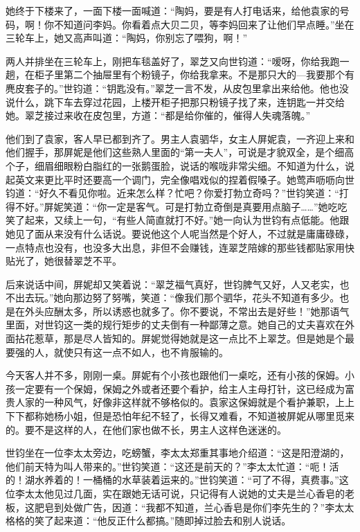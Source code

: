 \par 她终于下楼来了，一面下楼一面喊道：“陶妈，要是有人打电话来，给他袁家的号码，啊！你不知道问李妈。你看着点大贝二贝，等李妈回来了让他们早点睡。”坐在三轮车上，她又高声叫道：“陶妈，你别忘了喂狗，啊！”
\par 两人并排坐在三轮车上，刚把车毯盖好了，翠芝又向世钧道：“嗳呀，你给我跑一趟，在柜子里第二个抽屉里有个粉镜子，你给我拿来。不是那只大的—我要那个有麂皮套子的。”世钧道：“钥匙没有。”翠芝一言不发，从皮包里拿出来给他。他也没说什么，跳下车去穿过花园，上楼开柜子把那只粉镜子找了来，连钥匙一并交给她。翠芝接过来收在皮包里，方道：“都是给你催的，催得人失魂落魄。”
\par 他们到了袁家，客人早已都到齐了。男主人袁驷华，女主人屏妮袁，一齐迎上来和他们握手，那屏妮是他们这些熟人里面的“第一夫人”，可说是才貌双全，是个细高个子，细眉细眼粉白脂红的一张鹅蛋脸，说话的喉咙非常尖细。不知道为什么，说起英文来更比平时还要高一个调门，完全像唱戏似的捏着假嗓子。她莺声呖呖向世钧道：“好久不看见你啦。近来怎么样？忙吧？你爱打勃立奇吗？”世钧笑道：“打得不好。”屏妮笑道：“你一定是客气。可是打勃立奇倒是真要用点脑子……”她吃吃笑了起来，又续上一句，“有些人简直就打不好。”她一向认为世钧有点低能。他跟她见了面从来没有什么话说。要说他这个人呢当然是个好人，不过就是庸庸碌碌，一点特点也没有，也没多大出息，非但不会赚钱，连翠芝陪嫁的那些钱都贴家用快贴光了，她很替翠芝不平。
\par 后来说话中间，屏妮却又笑着说：“翠芝福气真好，世钧脾气又好，人又老实，也不出去玩。”她向那边努了努嘴，笑道：“像我们那个驷华，花头不知道有多少。也是在外头应酬太多，所以诱惑也就多了。你不要说，不常出去是好些！”她那语气里面，对世钧这一类的规行矩步的丈夫倒有一种鄙薄之意。她自己的丈夫喜欢在外面拈花惹草，那是尽人皆知的。屏妮觉得她就是这一点比不上翠芝。但是她是个最要强的人，就使只有这一点不如人，也不肯服输的。
\par 今天客人并不多，刚刚一桌。屏妮有个小孩也跟他们一桌吃，还有小孩的保姆。小孩一定要有一个保姆，保姆之外或者还要个看护，给主人主母打针，这已经成为富贵人家的一种风气，好像非这样就不够格似的。袁家这保姆就是个看护兼职，上上下下都称她杨小姐，但是恐怕年纪不轻了，长得又难看，不知道被屏妮从哪里觅来的。要不是这样的人，在他们家也做不长，男主人这样色迷迷的。
\par 世钧坐在一位李太太旁边，吃螃蟹，李太太郑重其事地介绍道：“这是阳澄湖的，他们前天特为叫人带来的。”世钧笑道：“这还是前天的？”李太太忙道：“呃！活的！湖水养着的！一桶桶的水草装着运来的。”世钧笑道：“可了不得，真费事。”这位李太太他见过几面，实在跟她无话可说，只记得有人说她的丈夫是兰心香皂的老板，这肥皂到处做广告，因道：“我都不知道，兰心香皂是你们李先生的？”李太太格格的笑了起来道：“他反正什么都搞。”随即掉过脸去和别人说话。
